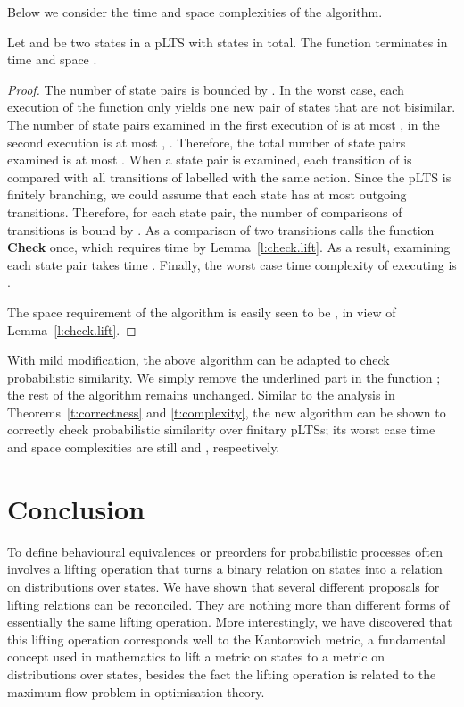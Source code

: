 \documentclass{article}
\begin{document}
Below we consider the time and space complexities of the algorithm.
\begin{theorem}\label{t:complexity}
Let  and  be two states in a pLTS with  states in total.
The function  terminates in time  and space .
\end{theorem}
\begin{proof}
 The number
of state pairs is bounded by . In the worst case, each
execution of the function  only yields one new
pair of states that are not bisimilar. The number of state pairs
examined in the first execution of  is at most
, in the second execution is at most , .
Therefore, the total number of state pairs examined is at most
. When a state pair  is
examined, each transition of  is compared with all transitions of
 labelled with the same action. Since the pLTS is finitely
branching, we could assume that each state has at most  outgoing
transitions. Therefore, for each state pair, the number of
comparisons of transitions is bound by . As a comparison of two
transitions calls the function \textbf{Check} once, which requires
time  by Lemma~\ref{l:check.lift}. As a result,
examining each state pair takes time .
Finally, the worst case time complexity of executing
 is .

The space requirement of the algorithm is easily seen to be
, in view of Lemma~\ref{l:check.lift}.
\end{proof}

\begin{remark} With mild modification, the above algorithm can be adapted to
check probabilistic similarity. We simply remove the underlined part
in the function ; the rest of the algorithm
remains unchanged. Similar to the analysis in
Theorems~\ref{t:correctness} and \ref{t:complexity}, the new
algorithm can be shown to correctly check probabilistic similarity
over finitary pLTSs; its worst case time and space complexities are
still  and  , respectively.
\end{remark}

\section{Conclusion}\label{s:conclude}
To define behavioural equivalences or preorders for probabilistic
processes often involves a lifting operation that turns a binary
relation  on states into a relation  on
distributions over states. We have shown that several different
proposals for lifting relations can be reconciled. They are nothing
more than different forms of essentially the same lifting operation.
More interestingly, we have discovered that this lifting operation
corresponds well to the Kantorovich metric, a fundamental concept
used in mathematics to lift a metric on states to a metric on
distributions over states, besides the fact the lifting operation is
related to the maximum flow problem in optimisation theory.
\end{document}
